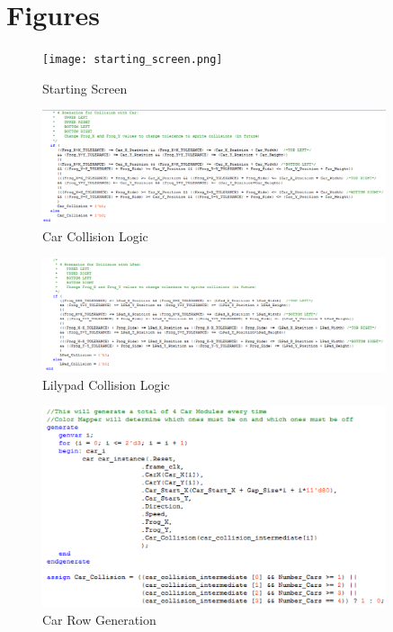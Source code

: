 \documentclass[journal, twocolumn, final,11pt,letterpaper]{IEEEtran}
\begin{document}
\clearpage
\onecolumn
\section{Figures}

\begin{figure}[H]
	\centering
	\texttt{[image: starting\_screen.png]}
	\caption{Starting Screen}
	\label{fig:starting-screen}
\end{figure}

\begin{figure}[H]
	\centering
	\includegraphics[width=0.9\textwidth]{car_collision.png}
	\caption{Car Collision Logic}
	\label{fig:car-collision}
\end{figure}

\begin{figure}[H]
	\centering
	\includegraphics[width=0.9\textwidth]{lilypad_collision.png}
	\caption{Lilypad Collision Logic}
	\label{fig:lilypad-collision}
\end{figure}

\begin{figure}[H]
	\centering
	\includegraphics[width=0.9\textwidth]{car_row_generation.png}
	\caption{Car Row Generation}
	\label{fig:car-row-generation}
\end{figure}
\end{document}
